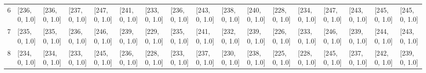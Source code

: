 \begin{tabular}{lllllllllllllllll}
6    &  [236, 0, 1.0] &  [236, 0, 1.0] &  [237, 0, 1.0] &    [247, 0, 1.0] &  [241, 0, 1.0] &  [233, 0, 1.0] &   [236, 0, 1.0] &    [243, 0, 1.0] &  [238, 0, 1.0] &  [240, 0, 1.0] &  [228, 0, 1.0] &   [234, 0, 1.0] &    [247, 0, 1.0] &    [243, 0, 1.0] &  [245, 0, 1.0] &    [245, 0, 1.0] \\
7    &  [235, 0, 1.0] &  [235, 0, 1.0] &  [236, 0, 1.0] &    [246, 0, 1.0] &  [239, 0, 1.0] &  [229, 0, 1.0] &   [235, 0, 1.0] &    [241, 0, 1.0] &  [232, 0, 1.0] &  [239, 0, 1.0] &  [226, 0, 1.0] &   [233, 0, 1.0] &    [246, 0, 1.0] &    [239, 0, 1.0] &  [244, 0, 1.0] &    [243, 0, 1.0] \\
8    &  [234, 0, 1.0] &  [234, 0, 1.0] &  [233, 0, 1.0] &    [245, 0, 1.0] &  [236, 0, 1.0] &  [228, 0, 1.0] &   [233, 0, 1.0] &    [237, 0, 1.0] &  [230, 0, 1.0] &  [238, 0, 1.0] &  [225, 0, 1.0] &   [228, 0, 1.0] &    [245, 0, 1.0] &    [237, 0, 1.0] &  [242, 0, 1.0] &    [239, 0, 1.0] \\
\bottomrule
\end{tabular}
